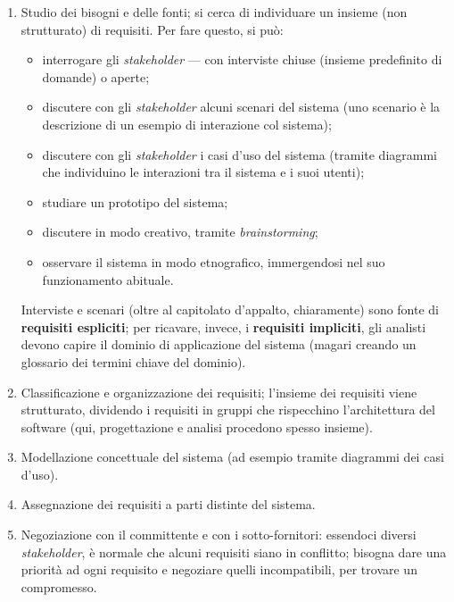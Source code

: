 \documentclass[a4paper]{article}
\begin{document}
	\begin{enumerate}
		
			
	\item Studio dei bisogni e delle fonti; si cerca di individuare un insieme (non strutturato) di requisiti. Per fare questo, si può:
				
	\begin{itemize}
		
					
	\item interrogare gli \emph{stakeholder} --- con interviste chiuse (insieme predefinito di domande) o aperte;
					
	\item discutere con gli \emph{stakeholder} alcuni scenari del sistema (uno scenario è la descrizione di un esempio di interazione col sistema);
					
	\item discutere con gli \emph{stakeholder} i casi d'uso del sistema (tramite diagrammi che individuino le interazioni tra il sistema e i suoi utenti);
					
	\item studiare un prototipo del sistema;
					
	\item discutere in modo creativo, tramite \emph{brainstorming};
					
	\item osservare il sistema in modo etnografico, immergendosi nel suo funzionamento abituale.
				
	\end{itemize}

			Interviste e scenari (oltre al capitolato d'appalto, chiaramente) sono fonte di \textbf{requisiti espliciti}; per ricavare, invece, i \textbf{requisiti impliciti}, gli analisti devono capire il dominio di applicazione del sistema (magari creando un glossario dei termini chiave del dominio).
			
			
	\item Classificazione e organizzazione dei requisiti; l'insieme dei requisiti viene strutturato, dividendo i requisiti in gruppi che rispecchino l'architettura del software (qui, progettazione e analisi procedono spesso insieme).
			
	\item Modellazione concettuale del sistema (ad esempio tramite diagrammi dei casi d'uso).
			
	\item Assegnazione dei requisiti a parti distinte del sistema.
			
	\item Negoziazione con il committente e con i sotto-fornitori: essendoci diversi \emph{stakeholder}, è normale che alcuni requisiti siano in conflitto; bisogna dare una priorità ad ogni requisito e negoziare quelli incompatibili, per trovare un compromesso.
		
	\end{enumerate}
\end{document}
